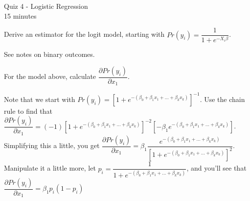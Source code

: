 \documentclass[10pt]{exam2}
\begin{document}
\begin{center}
{\LARGE Quiz 4 - Logistic Regression}\\\vspace{2mm}
\vspace{3mm}
{\large 15 minutes}\\\vspace{2mm}
\end{center}

\begin{questions}

\question Derive an estimator for the logit model, starting with $Pr(y_i) = \dfrac{1}{1 + e^{-X_i\beta}}$.
\begin{solution}[3.5in]
See notes on binary outcomes.
\end{solution}


\question For the model above, calculate $\dfrac{\partial Pr(y_i)}{\partial x_1}$.
\begin{solution}
Note that we start with $Pr(y_i) = \left[1 + e^{-(\beta_0 + \beta_1x_1 + ... + \beta_kx_k)}\right]^{-1}$. Use the chain rule to find that $\dfrac{\partial Pr(y_i)}{\partial x_1} = (-1)\left[1 + e^{-(\beta_0 + \beta_1x_1 + ... + \beta_kx_k)}\right]^{-2}\left[-\beta_1 e^{-(\beta_0 + \beta_1x_1 + ... + \beta_kx_k)}\right]$. Simplifying this a little, you get 
$\dfrac{\partial Pr(y_i)}{\partial x_1} = \beta_1
\dfrac
{
e^{-(\beta_0 + \beta_1x_1 + ... + \beta_kx_k)}
}
{
\left[1 + e^{-(\beta_0 + \beta_1x_1 + ... + \beta_kx_k)}\right]^{2}
}$. Manipulate it a little more, let $p_i = \dfrac{1}{1 + e^{-(\beta_0 + \beta_1x_1 + ... + \beta_kx_k)}}$, and you'll see that $\dfrac{\partial Pr(y_i)}{\partial x_1} = \beta_1p_i(1 - p_i)$
\end{solution} 
\end{questions}
\end{document}
